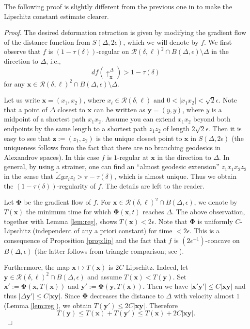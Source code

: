 \documentclass[a4paper,12pt]{amsart}
\theoremstyle{plain}
\theoremstyle{definition}
\numberwithin{thm}{section}
\numberwithin{equation}{section}
\begin{document}
The following proof is slightly different from the previous one in \cite{MY:lip} to make the Lipschitz constant estimate clearer.

\begin{proof}
The desired deformation retraction is given by modifying the gradient flow of the distance function from $S(\Delta,2\epsilon)$, which we will denote by $f$.
We first observe that $f$ is $(1-\tau(\delta))$-regular on $\mathcal R(\delta,\ell)^2\cap B(\Delta,\epsilon)\setminus\Delta$ in the direction to $\Delta$, i.e.,
\[df(\uparrow_{\mathbf x}^\Delta)>1-\tau(\delta)\]
for any $\mathbf x\in\mathcal R(\delta,\ell)^2\cap B(\Delta,\epsilon)\setminus\Delta$.

Let us write $\mathbf x=(x_1,x_2)$, where $x_i\in\mathcal R(\delta,\ell)$ and $0<|x_1x_2|<\sqrt 2\epsilon$.
Note that a point of $\Delta$ closest to $\mathbf x$ can be written as $\mathbf y=(y,y)$, where $y$ is a midpoint of a shortest path $x_1x_2$.
Assume you can extend $x_1x_2$ beyond both endpoints by the same length to a shortest path $z_1z_2$ of length $2\sqrt 2\epsilon$.
Then it is easy to see that $\mathbf z:=(z_1,z_2)$ is the unique closest point to $\mathbf x$ in $S(\Delta,2\epsilon)$ (the uniqueness follows from the fact that there are no branching geodesics in Alexandrov spaces).
In this case $f$ is $1$-regular at $\mathbf x$ in the direction to $\Delta$.
In general, by using a strainer, one can find an ``almost geodesic extension'' $z_1x_1x_2z_2$ in the sense that $\tilde\angle yx_iz_i>\pi-\tau(\delta)$, which is almost unique.
Thus we obtain the $(1-\tau(\delta))$-regularity of $f$.
The details are left to the reader.

Let $\mathbf\Phi$ be the gradient flow of $f$.
For $\mathbf x\in\mathcal R(\delta,\ell)^2\cap B(\Delta,\epsilon)$, we denote by $T(\mathbf x)$ the minimum time for which $\mathbf\Phi(\mathbf x,t)$ reaches $\Delta$.
The above observation, together with Lemma \ref{lem:reg}, shows $T(\mathbf x)<2\epsilon$.
Note that $\mathbf\Phi$ is uniformly $C$-Lipschitz (independent of any a priori constant) for time $<2\epsilon$.
This is a consequence of Proposition \ref{prop:lip} and the fact that $f$ is $(2\epsilon^{-1})$-concave on $B(\Delta,\epsilon)$ (the latter follows from triangle comparison; see \cite[2.4]{MY:loc}).

Furthermore, the map $\mathbf x\mapsto T(\mathbf x)$ is $2C$-Lipschitz.
Indeed, let $\mathbf y\in\mathcal R(\delta,\ell)^2\cap B(\Delta,\epsilon)$ and assume $T(\mathbf x)<T(\mathbf y)$.
Set $\mathbf x':=\mathbf\Phi(\mathbf x,T(\mathbf x))$ and $\mathbf y':=\mathbf\Phi(\mathbf y,T(\mathbf x))$.
Then we have $|\mathbf x'\mathbf y'|\le C|\mathbf x\mathbf y|$ and thus $|\Delta\mathbf y'|\le C|\mathbf x\mathbf y|$.
Since $\mathbf\Phi$ decreases the distance to $\Delta$ with velocity almost $1$ (Lemma \ref{lem:reg}), we obtain $T(\mathbf y')\le2C|\mathbf x\mathbf y|$.
Therefore
\[T(\mathbf y)\le T(\mathbf x)+T(\mathbf y')\le T(\mathbf x)+2C|\mathbf x\mathbf y|.\]


\end{proof}
\end{document}
